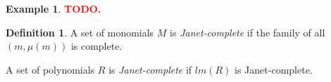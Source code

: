 \documentclass[10pt]{easychair}
\theoremstyle{definition}
\newtheorem{definition}[theorem]{Definition}
\newtheorem{example}[theorem]{Example}
\newcommand\todo[1]{{\bf\textcolor{red}{#1.}}}
\begin{document}
 \begin{example}
\todo{TODO}
 \end{example}

 \begin{definition}
   A set of monomials $M$ is \emph{Janet-complete} if the family of all $(m,\mu(m))$ is complete.

   A set of polynomials $R$ is \emph{Janet-complete} if $lm(R)$ is Janet-complete.
\end{definition}



 


\end{document}
